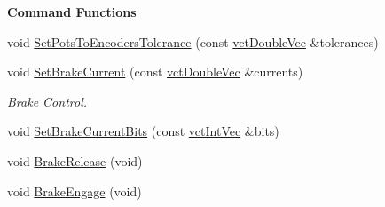 \begin{Indent}{\bf Command Functions}
\begin{DoxyCompactItemize}
void \hyperlink{classsaw_robot_i_o1394_1_1osa_robot1394_a25f45f1a866d1802da011d9c3b1fbfff}{Set\+Pots\+To\+Encoders\+Tolerance} (const \hyperlink{vct_dynamic_vector_types_8h_ade4b3068c86fb88f41af2e5187e491c2}{vct\+Double\+Vec} \&tolerances)
\item 
void \hyperlink{classsaw_robot_i_o1394_1_1osa_robot1394_a91d3f75e7f86defc1d85737f956e9b11}{Set\+Brake\+Current} (const \hyperlink{vct_dynamic_vector_types_8h_ade4b3068c86fb88f41af2e5187e491c2}{vct\+Double\+Vec} \&currents)
\begin{DoxyCompactList}\small\item\em Brake Control. \end{DoxyCompactList}\item 
void \hyperlink{classsaw_robot_i_o1394_1_1osa_robot1394_a9607d876dad522b0e8accf672083a073}{Set\+Brake\+Current\+Bits} (const \hyperlink{vct_dynamic_vector_types_8h_a47260df0b570a25352b3f318ed0b4c4e}{vct\+Int\+Vec} \&bits)
\item 
void \hyperlink{classsaw_robot_i_o1394_1_1osa_robot1394_ac82ce11beb6adad4783fb0f988fb6559}{Brake\+Release} (void)
\item 
void \hyperlink{classsaw_robot_i_o1394_1_1osa_robot1394_ad782e0761f93901333bc49b795f96f40}{Brake\+Engage} (void)
\end{DoxyCompactItemize}
\end{Indent}
